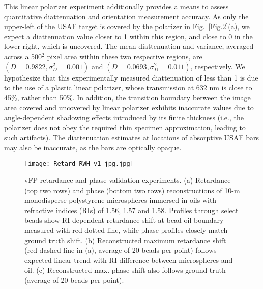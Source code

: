 \documentclass{article}
\begin{document}
This linear polarizer experiment additionally provides a means to assess quantitative diattenuation and orientation measurement accuracy. As only the upper-left of the USAF target is covered by the polarizer in Fig.~\ref{Fig.2}(a), we expect a diattenuation value closer to 1 within this region, and close to 0 in the lower right, which is uncovered. The mean diattenuation and variance, averaged across a 500$^2$ pixel area within these two respective regions, are $(\bar{D}=0.9822, \sigma^2_D=0.001)$ and $(\bar{D}=0.0693, \sigma^2_D=0.011)$, respectively. We hypothesize that this experimentally measured diattenuation of less than 1 is due to the use of a plastic linear polarizer, whose transmission at 632 nm is close to 45\%, rather than 50\%. In addition, the transition boundary between the image area covered and uncovered by linear polarizer exhibits inaccurate values due to angle-dependent shadowing effects introduced by its finite thickness (i.e., the polarizer does not obey the required thin specimen approximation, leading to such artifacts). The diattenuation estimates at locations of absorptive USAF bars may also be inaccurate, as the bars are optically opaque. 

 \begin{figure}[t!]
\begin{center}
    \texttt{[image: Retard\_RWH\_v1\_jpg.jpg]}
    \caption{vFP retardance and phase validation experiments. (a) Retardance (top two rows) and phase (bottom two rows) reconstructions of 10-\textmu m monodisperse polystyrene microspheres immersed in oils with refractive indices (RIs) of 1.56, 1.57 and 1.58. Profiles through select beads show RI-dependent retardance shift at bead-oil boundary measured with red-dotted line, while phase profiles closely match ground truth shift. (b) Reconstructed maximum retardance shift (red dashed line in (a), average of 20 beads per point) follows expected linear trend with RI difference between microspheres and oil. (c) Reconstructed max. phase shift also follows ground truth (average of 20 beads per point).}
    \label{Fig.4}
\end{center}
\end{figure}
\end{document}
